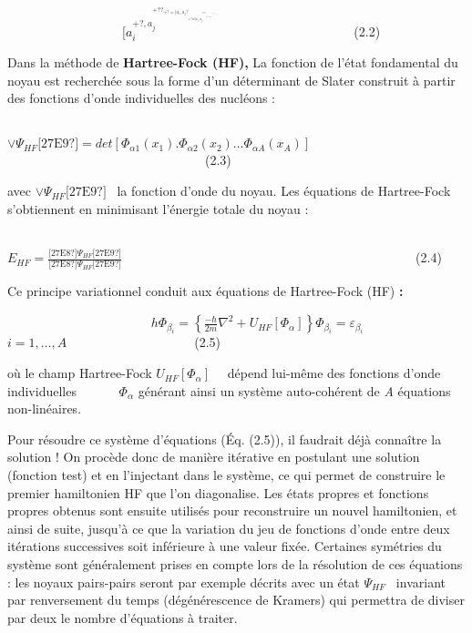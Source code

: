 \documentclass[a4paper]{article}
\begin{document}
\bigskip

\ \ \ \ \ \ \ \ \ \ \ \ \ \ \ \ \ \ 
$[a_i^{+?,a_j^{+??_{+?=[a_i,a_j?_{+?\mathit{et}[a_i,a_j^{+??_{+?=[a_i^{+?,a_j?_{+?=\delta
_{\mathit{ij}}}}}}}}}}$\ \ \ \ \ \ \ \ \ \ \ \ \ \ \ \ \ \ \ \ \ (2.2)


\bigskip

Dans la méthode de \textbf{Hartree-Fock (HF),} La fonction de l’état fondamental du noyau est recherchée sous la forme
d’un déterminant de Slater construit à partir des fonctions d'onde individuelles des nucléons : 


\bigskip

\ \ \ \ \ \ \ \ \ \ \ \ \ \ \ \ \ \ \ \ \ \ \ \ \ \ \ \ \ \ \ \ \  $\vee \Psi
_{\mathit{HF}}\text{[27E9?]}=\mathit{det}\left[\Phi _{\mathit{\alpha 1}}\left(x_1\right).\Phi _{\mathit{\alpha
2}}\left(x_2\right){\dots}\Phi _{\mathit{\alpha
A}}\left(x_A\right)\right]$\ \ \ \ \ \ \ \ \ \ \ \ \ \ \ \ \ \ \ \ \ \ \ \ \ \ \ \ \ \ \ (2.3)


\bigskip

avec  $\vee \Psi _{\mathit{HF}}\text{[27E9?]}$ \ la fonction d’onde du noyau. Les équations de Hartree-Fock s’obtiennent
en minimisant l’énergie totale du noyau :

\ \ \ \ \ \ \ \ \ \ \ \ \ \ \ \ \ \ \ \ \ \ \ \ \ \ \ \ \ \ \ \ \ \ \ \ \ \ \ \ \ \ \ \ \ \ \ \ \ \ \ \ \ \ \ \ \ \ \ \ \ \ \ \ \ \ \ \ \ \ \ \ 
$E_{\mathit{HF}}=\frac{\text{[27E8?]}\Psi _{\mathit{HF}}\text{[27E9?]}}{\text{[27E8?]}\Psi
_{\mathit{HF}}\text{[27E9?]}}$\ \ \ \ \ \ \ \ \ \ \ \ \ \ \ \ \ \ \ \ \ \ \ \ \ \ \ \ \ \ \ \ \ \ \ \ \ \ \ \ \ \ \ \ \ \ (2.4)


\bigskip

Ce principe variationnel conduit aux équations de Hartree-Fock (HF) \textbf{:}

\textbf{\ \ \ \ \ \ \ \ \ \ \ \ \ \ \ \ \ \ \ } $h\Phi _{\beta _i}=\left\{\frac{-\hbar
}{2m}{\nabla}^2+U_{\mathit{HF}}\left[\Phi _{\alpha }\right]\right\}\Phi _{\beta _i}=\varepsilon _{\beta
_i}$\textbf{\ \ \ \ \ \ } $i=1,{\dots},A$\ \ \ \ \ \ \ \ \ \ \ \ \ \ \ \ \ \ \ \ (2.5)

où le champ Hartree-Fock  $U_{\mathit{HF}}\left[\Phi _{\alpha }\right]$ \ \ dépend lui-même des fonctions d’onde
individuelles \ \ \ \ \ \  $\Phi _{\alpha }$ générant ainsi un système auto-cohérent de \textit{A }équations
non-linéaires.

Pour résoudre ce système d’équations (Éq. (2.5)), il faudrait déjà connaître la solution ! On procède donc de manière
itérative en postulant une solution (fonction test) et en l’injectant dans le système, ce qui permet de construire le
premier hamiltonien HF que l’on diagonalise. Les états propres et fonctions propres obtenus sont ensuite utilisés pour
reconstruire un nouvel hamiltonien, et ainsi de suite, jusqu’à ce que la variation du jeu de fonctions d’onde entre
deux itérations successives soit inférieure à une valeur fixée. Certaines symétries du système sont généralement prises
en compte lors de la résolution de ces équations : les noyaux pairs-pairs seront par exemple décrits avec un état 
$\Psi _{\mathit{HF}}$ \ invariant par renversement du temps (dégénérescence de Kramers) qui permettra de diviser par
deux le nombre d’équations à traiter. 
\end{document}
